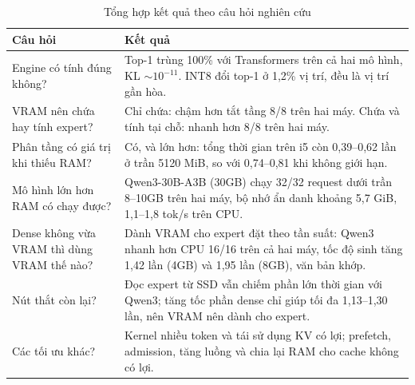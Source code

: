 \begin{table}[htbp]
\centering
\caption{Tổng hợp kết quả theo câu hỏi nghiên cứu}
\label{tab:summary}
\small
\setlength{\tabcolsep}{3pt}
\begin{tabularx}{\textwidth}{>{\RaggedRight\arraybackslash}p{4.4cm} >{\RaggedRight\arraybackslash}X}
\toprule
\textbf{Câu hỏi} & \textbf{Kết quả} \\
\midrule
Engine có tính đúng không? & Top-1 trùng 100\% với Transformers trên cả hai mô hình, KL $\sim10^{-11}$. INT8 đổi top-1 ở 1,2\% vị trí, đều là vị trí gần hòa. \\
VRAM nên chứa hay tính expert? & Chỉ chứa: chậm hơn tắt tầng 8/8 trên hai máy. Chứa và tính tại chỗ: nhanh hơn 8/8 trên hai máy. \\
Phân tầng có giá trị khi thiếu RAM? & Có, và lớn hơn: tổng thời gian trên i5 còn 0,39--0,62 lần ở trần 5120 MiB, so với 0,74--0,81 khi không giới hạn. \\
Mô hình lớn hơn RAM có chạy được? & Qwen3-30B-A3B (30GB) chạy 32/32 request dưới trần 8--10GB trên hai máy, bộ nhớ ẩn danh khoảng 5,7 GiB, 1,1--1,8 tok/s trên CPU. \\
Dense không vừa VRAM thì dùng VRAM thế nào? & Dành VRAM cho expert đặt theo tần suất: Qwen3 nhanh hơn CPU 16/16 trên cả hai máy, tốc độ sinh tăng 1,42 lần (4GB) và 1,95 lần (8GB), văn bản khớp. \\
Nút thắt còn lại? & Đọc expert từ SSD vẫn chiếm phần lớn thời gian với Qwen3; tăng tốc phần dense chỉ giúp tối đa 1,13--1,30 lần, nên VRAM nên dành cho expert. \\
Các tối ưu khác? & Kernel nhiều token và tái sử dụng KV có lợi; prefetch, admission, tăng luồng và chia lại RAM cho cache không có lợi. \\
\bottomrule
\end{tabularx}
\end{table}
